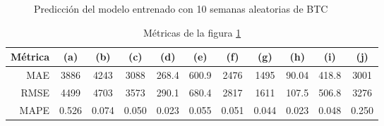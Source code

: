 \documentclass[a4paper,10pt]{article}
\begin{document}
\begin{figure}[h]
    \\
    \\
  \caption{Predicción del modelo entrenado con 10 semanas aleatorias de BTC}
  \label{f:btc_wk_arima}
\end{figure}

\begin{table}[h]
 \begin{center}
  \begin{tabular}{|r|c|c|c|c|c|c|c|c|c|c|}
    Métrica & (a) & (b) & (c) & (d) & (e) & (f) & (g) & (h) & (i) & (j) \\ \hline
    MAE & 3886 & 4243 & 3088 & 268.4 & 600.9 & 2476 & 1495 & 90.04 & 418.8 & 3001 \\
    RMSE & 4499 & 4703 & 3573 & 290.1 & 680.4 & 2817 & 1611 & 107.5 & 506.8 & 3276 \\
    MAPE & 0.526 & 0.074 & 0.050 & 0.023 & 0.055 & 0.051 & 0.044 & 0.023 & 0.048 & 0.250 \\ \hline
  \end{tabular}
  \caption{Métricas de la figura \ref{f:btc_wk_arima}}
  \label{tab:btc}
 \end{center}
\end{table}
\end{document}
